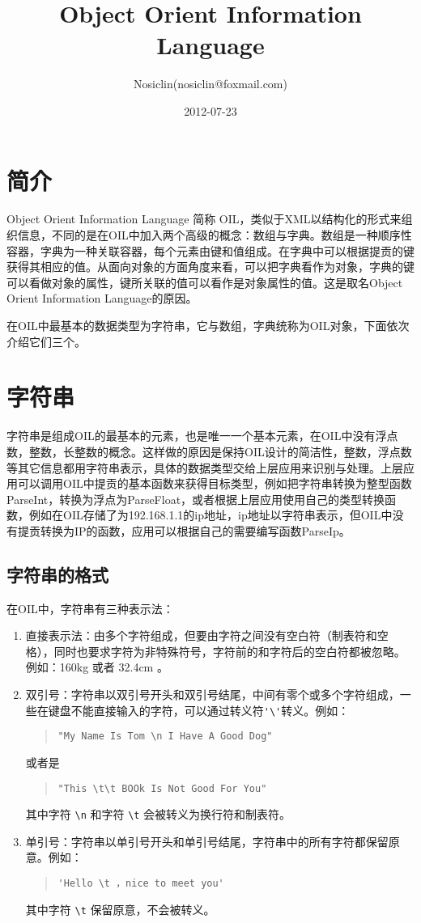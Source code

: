 \documentclass[a4paper]{article}
\begin{document}
\begin{CJK}{UTF8}{song}
\title{Object Orient Information Language}
\author{Nosiclin(nosiclin@foxmail.com)}
\date{2012-07-23}
\maketitle

\section{简介}
Object Orient Information Language 简称 OIL，类似于XML以结构化的形式来组织信息，不同的是在OIL中加入两个高级的概念：数组与字典。数组是一种顺序性容器，字典为一种关联容器，每个元素由键和值组成。在字典中可以根据提贡的键获得其相应的值。从面向对象的方面角度来看，可以把字典看作为对象，字典的键可以看做对象的属性，键所关联的值可以看作是对象属性的值。这是取名Object Orient Information Language的原因。

在OIL中最基本的数据类型为字符串，它与数组，字典统称为OIL对象，下面依次介绍它们三个。
\section{字符串}
字符串是组成OIL的最基本的元素，也是唯一一个基本元素，在OIL中没有浮点数，整数，长整数的概念。这样做的原因是保持OIL设计的简洁性，整数，浮点数等其它信息都用字符串表示，具体的数据类型交给上层应用来识别与处理。上层应用可以调用OIL中提贡的基本函数来获得目标类型，例如把字符串转换为整型函数ParseInt，转换为浮点为ParseFloat，或者根据上层应用使用自己的类型转换函数，例如在OIL存储了为192.168.1.1的ip地址，ip地址以字符串表示，但OIL中没有提贡转换为IP的函数，应用可以根据自己的需要编写函数ParseIp。

\subsection{字符串的格式}
在OIL中，字符串有三种表示法：
\begin{enumerate}
 \item 直接表示法：由多个字符组成，但要由字符之间没有空白符（制表符和空格），同时也要求字符为非特殊符号，字符前的和字符后的空白符都被忽略。例如：160kg 或者 32.4cm 。
\item 双引号：字符串以双引号开头和双引号结尾，中间有零个或多个字符组成，一些在键盘不能直接输入的字符，可以通过转义符\verb|'\'|转义。例如：
\begin{quote}
\verb|"My Name Is Tom \n I Have A Good Dog"|
\end{quote}
 或者是 
\begin{quote}
\verb|"This \t\t BOOk Is Not Good For You"|
\end{quote}
其中字符 \verb|\n| 和字符 \verb|\t| 会被转义为换行符和制表符。
\item 单引号：字符串以单引号开头和单引号结尾，字符串中的所有字符都保留原意。例如：
\begin{quote}
\verb|'Hello \t ，nice to meet you'|
\end{quote}
其中字符 \verb|\t| 保留原意，不会被转义。
\end{enumerate}


\end{CJK}
\end{document}
